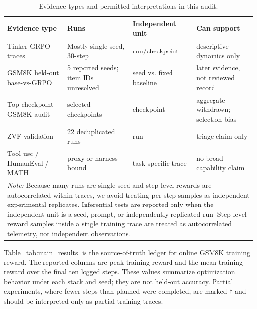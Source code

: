 \begin{table}[htbp]
\centering
\caption{Evidence types and permitted interpretations in this audit.}
\label{tab:evidence_types_detail}
\scriptsize
\begin{tabular}{p{3.2cm}p{3.0cm}p{2.5cm}p{2.5cm}}
\toprule
\textbf{Evidence type} & \textbf{Runs} & \textbf{Independent unit} & \textbf{Can support} \\
\midrule
Tinker GRPO traces & Mostly single-seed, 30-step & run/checkpoint & descriptive dynamics only \\
GSM8K held-out base-vs-GRPO & 5 reported seeds; item IDs unresolved & seed vs. fixed baseline & later evidence, not reviewed record \\
Top-checkpoint GSM8K audit & selected checkpoints & checkpoint & aggregate withdrawn; selection bias \\
ZVF validation & 22 deduplicated runs & run & triage claim only \\
Tool-use / HumanEval / MATH & proxy or harness-bound & task-specific trace & no broad capability claim \\
\midrule
\multicolumn{4}{p{11.2cm}}{\small \textit{Note:} Because many runs are single-seed and step-level rewards are autocorrelated within traces, we avoid treating per-step samples as independent experimental replicates. Inferential tests are reported only when the independent unit is a seed, prompt, or independently replicated run. Step-level reward samples inside a single training trace are treated as autocorrelated telemetry, not independent observations.} \\
\bottomrule
\end{tabular}
\end{table}

Table~\ref{tab:main_results} is the source-of-truth ledger for online GSM8K
training reward.  The reported columns are peak training reward and the mean
training reward over the final ten logged steps.  These values summarize
optimization behavior under each stack and seed; they are not held-out accuracy.
Partial experiments, where fewer steps than planned were completed, are marked
$\dagger$ and should be interpreted only as partial training traces.

